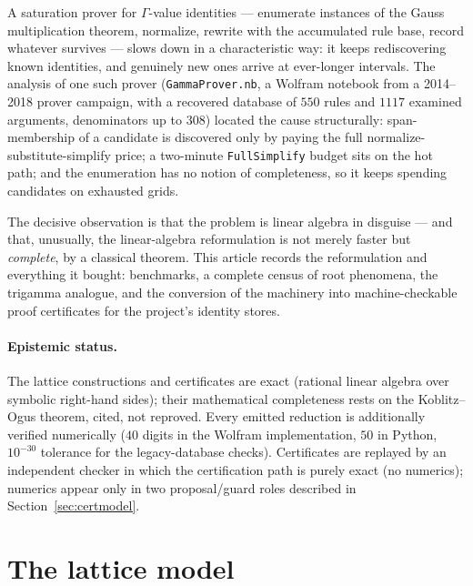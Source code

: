 \documentclass[11pt]{article}
\theoremstyle{remark}
\begin{document}
A saturation prover for $\Gamma$-value identities --- enumerate instances of the Gauss
multiplication theorem, normalize, rewrite with the accumulated rule base, record whatever
survives --- slows down in a characteristic way: it keeps rediscovering known identities,
and genuinely new ones arrive at ever-longer intervals. The analysis of one such prover
(\texttt{GammaProver.nb}, a Wolfram notebook from a 2014--2018 prover campaign, with a
recovered database of $550$ rules and $1117$ examined arguments, denominators up to $308$)
located the cause structurally: span-membership of a candidate is discovered only by paying the full
normalize-substitute-simplify price; a two-minute \texttt{FullSimplify} budget sits on the
hot path; and the enumeration has no notion of completeness, so it keeps spending
candidates on exhausted grids.

The decisive observation is that the problem is linear algebra in disguise --- and that,
unusually, the linear-algebra reformulation is not merely faster but \emph{complete}, by a
classical theorem. This article records the reformulation and everything it bought:
benchmarks, a complete census of root phenomena, the trigamma analogue, and the conversion
of the machinery into machine-checkable proof certificates for the project's identity
stores.

\paragraph{Epistemic status.}
The lattice constructions and certificates are exact (rational linear algebra over
symbolic right-hand sides); their mathematical completeness rests on the Koblitz--Ogus
theorem, cited, not reproved. Every emitted reduction is additionally verified numerically
($40$ digits in the Wolfram implementation, $50$ in Python, $10^{-30}$ tolerance for the
legacy-database checks). Certificates are replayed by an independent checker in which the
certification path is purely exact (no numerics); numerics appear only in two
proposal/guard roles described in Section~\ref{sec:certmodel}.

\section{The lattice model}\label{sec:lattice}
\end{document}
